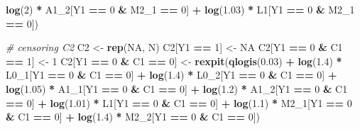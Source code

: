 \documentclass[
]{book}
\newenvironment{Shaded}{\begin{snugshade}}{\end{snugshade}}
\newcommand{\CommentTok}[1]{\textcolor[rgb]{0.56,0.35,0.01}{\textit{#1}}}
\newcommand{\ConstantTok}[1]{\textcolor[rgb]{0.56,0.35,0.01}{#1}}
\newcommand{\DecValTok}[1]{\textcolor[rgb]{0.00,0.00,0.81}{#1}}
\newcommand{\FloatTok}[1]{\textcolor[rgb]{0.00,0.00,0.81}{#1}}
\newcommand{\FunctionTok}[1]{\textcolor[rgb]{0.13,0.29,0.53}{\textbf{#1}}}
\newcommand{\NormalTok}[1]{#1}
\newcommand{\OtherTok}[1]{\textcolor[rgb]{0.56,0.35,0.01}{#1}}
\newcommand{\SpecialCharTok}[1]{\textcolor[rgb]{0.81,0.36,0.00}{\textbf{#1}}}
\begin{document}
\begin{Shaded}
\begin{Highlighting}[]
                                        \FunctionTok{log}\NormalTok{(}\DecValTok{2}\NormalTok{) }\SpecialCharTok{*}\NormalTok{ A1\_2[Y1 }\SpecialCharTok{==} \DecValTok{0} \SpecialCharTok{\&}\NormalTok{ M2\_1 }\SpecialCharTok{==} \DecValTok{0}\NormalTok{] }\SpecialCharTok{+} 
                                        \FunctionTok{log}\NormalTok{(}\FloatTok{1.03}\NormalTok{) }\SpecialCharTok{*}\NormalTok{ L1[Y1 }\SpecialCharTok{==} \DecValTok{0} \SpecialCharTok{\&}\NormalTok{ M2\_1 }\SpecialCharTok{==} \DecValTok{0}\NormalTok{])}
  
  \CommentTok{\# censoring C2}
\NormalTok{  C2 }\OtherTok{\textless{}{-}} \FunctionTok{rep}\NormalTok{(}\ConstantTok{NA}\NormalTok{, N)}
\NormalTok{  C2[Y1 }\SpecialCharTok{==} \DecValTok{1}\NormalTok{] }\OtherTok{\textless{}{-}} \ConstantTok{NA}
\NormalTok{  C2[Y1 }\SpecialCharTok{==} \DecValTok{0} \SpecialCharTok{\&}\NormalTok{ C1 }\SpecialCharTok{==} \DecValTok{1}\NormalTok{] }\OtherTok{\textless{}{-}} \DecValTok{1}
\NormalTok{  C2[Y1 }\SpecialCharTok{==} \DecValTok{0} \SpecialCharTok{\&}\NormalTok{ C1 }\SpecialCharTok{==} \DecValTok{0}\NormalTok{] }\OtherTok{\textless{}{-}} \FunctionTok{rexpit}\NormalTok{(}\FunctionTok{qlogis}\NormalTok{(}\FloatTok{0.03}\NormalTok{) }\SpecialCharTok{+} 
                                    \FunctionTok{log}\NormalTok{(}\FloatTok{1.4}\NormalTok{) }\SpecialCharTok{*}\NormalTok{ L0\_1[Y1 }\SpecialCharTok{==} \DecValTok{0} \SpecialCharTok{\&}\NormalTok{ C1 }\SpecialCharTok{==} \DecValTok{0}\NormalTok{] }\SpecialCharTok{+} 
                                    \FunctionTok{log}\NormalTok{(}\FloatTok{1.4}\NormalTok{) }\SpecialCharTok{*}\NormalTok{ L0\_2[Y1 }\SpecialCharTok{==} \DecValTok{0} \SpecialCharTok{\&}\NormalTok{ C1 }\SpecialCharTok{==} \DecValTok{0}\NormalTok{] }\SpecialCharTok{+} 
                                    \FunctionTok{log}\NormalTok{(}\FloatTok{1.05}\NormalTok{) }\SpecialCharTok{*}\NormalTok{ A1\_1[Y1 }\SpecialCharTok{==} \DecValTok{0} \SpecialCharTok{\&}\NormalTok{ C1 }\SpecialCharTok{==} \DecValTok{0}\NormalTok{] }\SpecialCharTok{+} 
                                    \FunctionTok{log}\NormalTok{(}\FloatTok{1.2}\NormalTok{) }\SpecialCharTok{*}\NormalTok{ A1\_2[Y1 }\SpecialCharTok{==} \DecValTok{0} \SpecialCharTok{\&}\NormalTok{ C1 }\SpecialCharTok{==} \DecValTok{0}\NormalTok{] }\SpecialCharTok{+} 
                                    \FunctionTok{log}\NormalTok{(}\FloatTok{1.01}\NormalTok{) }\SpecialCharTok{*}\NormalTok{ L1[Y1 }\SpecialCharTok{==} \DecValTok{0} \SpecialCharTok{\&}\NormalTok{ C1 }\SpecialCharTok{==} \DecValTok{0}\NormalTok{] }\SpecialCharTok{+} 
                                    \FunctionTok{log}\NormalTok{(}\FloatTok{1.1}\NormalTok{) }\SpecialCharTok{*}\NormalTok{ M2\_1[Y1 }\SpecialCharTok{==} \DecValTok{0} \SpecialCharTok{\&}\NormalTok{ C1 }\SpecialCharTok{==} \DecValTok{0}\NormalTok{] }\SpecialCharTok{+} 
                                    \FunctionTok{log}\NormalTok{(}\FloatTok{1.4}\NormalTok{) }\SpecialCharTok{*}\NormalTok{ M2\_2[Y1 }\SpecialCharTok{==} \DecValTok{0} \SpecialCharTok{\&}\NormalTok{ C1 }\SpecialCharTok{==} \DecValTok{0}\NormalTok{])}


\end{Highlighting}
\end{Shaded}
\end{document}
